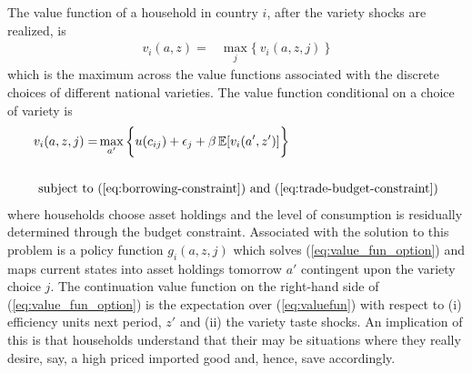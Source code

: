 \documentclass[12pt,pdftex]{article}
\begin{document}
\begin{onehalfspacing}
The value function of a household in country $i$, after the variety shocks are realized, is
\begin{align}
v_{i}(a, z) = &  \max_{j} \big  \{ \  v_{i}(a, z, j)  \ \big \}
\label{eq:valuefun}
\end{align}
which is the maximum across the value functions associated with the discrete choices of different national varieties. The value function conditional on a choice of variety is
\begin{align}
v_{i}(a, z, j) = &  \max_{\ a' \ }\bigg  \{ u(c_{ij}) + \epsilon_{j}  + \beta \, \mathbb{E} [v_{i}(a', z')]  \bigg\}
\label{eq:value_fun_option} \\
\nonumber \\
\mbox{subject to}  \ & (\ref{eq:borrowing-constraint}) \  \mathrm{and} \ (\ref{eq:trade-budget-constraint}) \nonumber
\end{align}
where households choose asset holdings and the level of consumption is residually determined through the budget constraint. Associated with the solution to this problem is a policy function $g_{i}(a,z, j)$ which solves (\ref{eq:value_fun_option}) and maps current states into asset holdings tomorrow $a'$ contingent upon the variety choice $j$. The continuation value function on the right-hand side of (\ref{eq:value_fun_option}) is the expectation over (\ref{eq:valuefun}) with respect to (i) efficiency units next period, $z'$ and (ii) the variety taste shocks. An implication of this is that households understand that their may be situations where they really desire, say, a high priced imported good and, hence, save accordingly.


\end{onehalfspacing}
\end{document}
